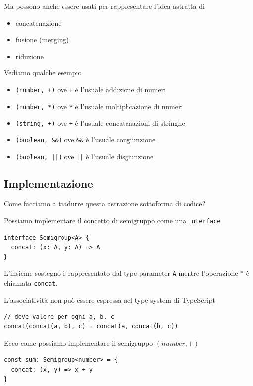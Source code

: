 \documentclass[12pt]{article}
\begin{document}
Ma possono anche essere usati per rappresentare l'idea astratta di

\begin{itemize}
  \item concatenazione
  \item fusione (merging)
  \item riduzione
\end{itemize}

Vediamo qualche esempio

\begin{itemize}
  \item \texttt{(number, +)} ove \texttt{+} è l'usuale addizione di numeri
  \item \texttt{(number, *)} ove \texttt{*} è l'usuale moltiplicazione di numeri
  \item \texttt{(string, +)} ove \texttt{+} è l'usuale concatenazioni di stringhe
  \item \texttt{(boolean, \&\&)} ove \texttt{\&\&} è l'usuale congiunzione
  \item \texttt{(boolean, ||)} ove \texttt{||} è l'usuale disgiunzione
\end{itemize}

\subsection{Implementazione}

Come facciamo a tradurre questa astrazione sottoforma di codice?

Possiamo implementare il concetto di semigruppo come una \texttt{interface}

\begin{verbatim}
interface Semigroup<A> {
  concat: (x: A, y: A) => A
}
\end{verbatim}

L'insieme sostegno è rappresentato dal type parameter \texttt{A} mentre l'operazione $*$ è chiamata \texttt{concat}.

L'associatività non può essere espressa nel type system di TypeScript

\begin{verbatim}
// deve valere per ogni a, b, c
concat(concat(a, b), c) = concat(a, concat(b, c))
\end{verbatim}

Ecco come possiamo implementare il semigruppo $(number, +)$

\begin{verbatim}
const sum: Semigroup<number> = {
  concat: (x, y) => x + y
}
\end{verbatim}
\end{document}
